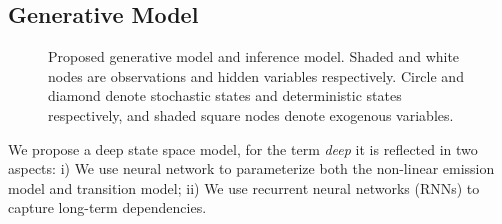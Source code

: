 \documentclass{article}
\begin{document}
\subsection{Generative Model}\label{sec:GM}
\begin{figure}[tb!]
    \centering
    \caption{Proposed generative model and inference model. Shaded and white nodes are observations and hidden variables respectively. Circle and diamond denote stochastic states and deterministic states respectively, and shaded square nodes denote exogenous variables.}
    \label{fig:framework}
\end{figure}
We propose a deep state space model, for the term \emph{deep} it is reflected in two aspects: i) We use neural network to parameterize both the non-linear emission model and transition model; ii) We use recurrent neural networks (RNNs) to capture long-term dependencies.
\end{document}
